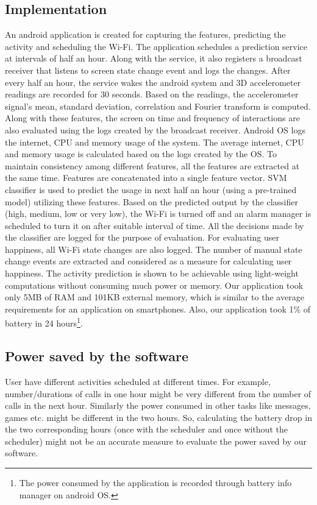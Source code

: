 \subsection{Implementation}
\label{sec:Implementation}
An android application is created for capturing the features, predicting the activity and scheduling the Wi-Fi. The application schedules a prediction service at intervals of half an hour. Along with the service, it also registers a broadcast receiver that listens to screen state change event and logs the changes. After every half an hour, the service wakes the android system and 3D accelerometer readings are recorded for 30 seconds. Based on the readings, the accelerometer signal's mean, standard deviation, correlation and Fourier transform is computed. Along with these features, the screen on time and frequency of interactions are also evaluated using the logs created by the broadcast receiver. Android OS logs the internet, CPU and memory usage of the system. The average internet, CPU and memory usage is calculated based on the logs created by the OS. To maintain consistency among different features, all the features are extracted at the same time. Features are concatenated into a single feature vector. SVM classifier is used to predict the usage in next half an hour (using a pre-trained model) utilizing these features. Based on the predicted output by the classifier (high, medium, low or very low), the Wi-Fi is turned off and an alarm manager is scheduled to turn it on after suitable interval of time. All the decisions made by the classifier are logged for the purpose of evaluation. For evaluating user happiness, all Wi-Fi state changes are also logged. The number of manual state change events are extracted and considered as a measure for calculating user happiness. The activity prediction is shown to be achievable using light-weight computations without consuming much power or memory. Our application took only 5MB of RAM and 101KB external memory, which is similar to the average requirements for an application on smartphones. Also, our application took 1\% of battery in 24 hours\footnote{The power consumed by the application is recorded through battery info manager on android OS.}.

\subsection{Power saved by the software}
\label{powersaved}
User have different activities scheduled at different times. For example, number/durations of calls in one hour might be very different from the number of calls in the next hour. Similarly the power consumed in other tasks like messages, games etc. might be different in the two hours. So, calculating the battery drop in the two corresponding hours (once with the scheduler and once without the scheduler) might not be an accurate measure to evaluate the power saved by our software.


